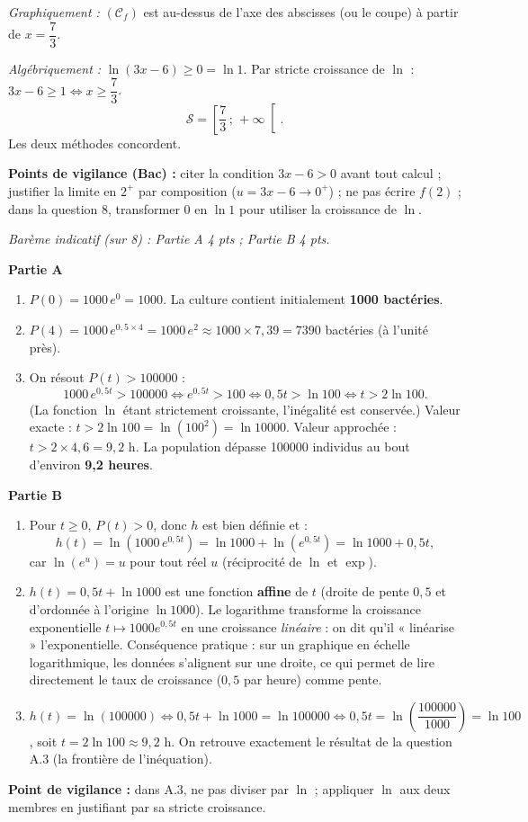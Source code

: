 \documentclass[11pt]{article}
\begin{document}
\begin{corrige}
\begin{enumerate}
\emph{Graphiquement :} $(\mathcal{C}_f)$ est au-dessus de l'axe des abscisses (ou le coupe) à partir de $x=\dfrac{7}{3}$.

\emph{Algébriquement :} $\ln(3x-6)\geq 0=\ln 1$. Par stricte croissance de $\ln$ : $3x-6\geq 1 \iff x\geq\dfrac{7}{3}$.
\[ \mathcal{S}=\left[\dfrac{7}{3}\,;\,+\infty\right[. \]
Les deux méthodes concordent.
\end{enumerate}
\textbf{Points de vigilance (Bac) :} citer la condition $3x-6>0$ avant tout calcul ; justifier la limite en $2^+$ par composition ($u=3x-6\to 0^+$) ; ne pas écrire $f(2)$ ; dans la question 8, transformer $0$ en $\ln 1$ pour utiliser la croissance de $\ln$.
\end{corrige}

\begin{corrige}
\emph{Barème indicatif (sur 8) : Partie A 4 pts ; Partie B 4 pts.}

\textbf{Partie A}
\begin{enumerate}
\item $P(0)=1000\,e^0=1000$. La culture contient initialement \textbf{\num{1000} bactéries}.
\item $P(4)=1000\,e^{0,5\times 4}=1000\,e^2\approx 1000\times 7{,}39=\num{7390}$ bactéries (à l'unité près).
\item On résout $P(t)>\num{100000}$ :
\[ 1000\,e^{0,5t}>\num{100000} \iff e^{0,5t}>100 \iff 0,5t>\ln 100 \iff t>2\ln 100. \]
(La fonction $\ln$ étant strictement croissante, l'inégalité est conservée.) Valeur exacte : $t>2\ln 100=\ln(100^2)=\ln\num{10000}$. Valeur approchée : $t>2\times 4{,}6=9{,}2$ h. La population dépasse \num{100000} individus au bout d'environ \textbf{9,2 heures}.
\end{enumerate}
\textbf{Partie B}
\begin{enumerate}
\item Pour $t\geq 0$, $P(t)>0$, donc $h$ est bien définie et :
\[ h(t)=\ln\left(1000\,e^{0,5t}\right)=\ln 1000+\ln\left(e^{0,5t}\right)=\ln 1000+0,5t, \]
car $\ln(e^u)=u$ pour tout réel $u$ (réciprocité de $\ln$ et $\exp$).
\item $h(t)=0,5t+\ln 1000$ est une fonction \textbf{affine} de $t$ (droite de pente $0,5$ et d'ordonnée à l'origine $\ln 1000$). Le logarithme transforme la croissance exponentielle $t\mapsto 1000e^{0,5t}$ en une croissance \emph{linéaire} : on dit qu'il « linéarise » l'exponentielle. Conséquence pratique : sur un graphique en échelle logarithmique, les données s'alignent sur une droite, ce qui permet de lire directement le taux de croissance ($0,5$ par heure) comme pente.
\item $h(t)=\ln(100000) \iff 0,5t+\ln 1000=\ln 100000 \iff 0,5t=\ln\left(\dfrac{100000}{1000}\right)=\ln 100$, soit $t=2\ln 100\approx 9{,}2$ h. On retrouve exactement le résultat de la question A.3 (la frontière de l'inéquation).
\end{enumerate}
\textbf{Point de vigilance :} dans A.3, ne pas diviser par $\ln$ ; appliquer $\ln$ aux deux membres en justifiant par sa stricte croissance.
\end{corrige}
\end{document}
